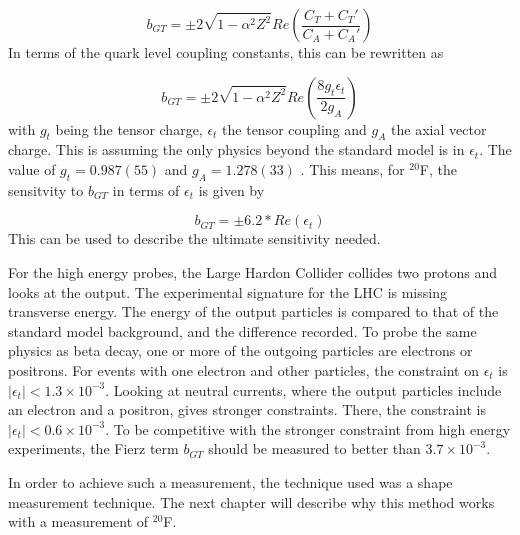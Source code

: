 \documentclass[../MaxHughesThesis.tex]{subfiles}
\begin{document}
\begin{equation}
	b_{GT} = \pm 2 \sqrt{1 - \alpha^{2} Z^{2}} Re(\frac{C_{T} + C_{T}'}{C_{A} + C_{A}'})
	\label{eq:bgt}
\end{equation}
In terms of the quark level coupling constants, this can be rewritten as \cite{Gon19} %

\begin{equation}
	b_{GT} = \pm 2 \sqrt{1 - \alpha^{2} Z^{2}} Re(\frac{8 g_{t} \epsilon_{t}}{2 g_{A}})
	\label{eq:bgtquarklevel}
\end{equation}
with $g_{t}$ being the tensor charge, $\epsilon_{t}$ the tensor coupling and $g_{A}$ the axial vector charge.
This is assuming the only physics beyond the standard model is in $\epsilon_{t}$.
The value of $g_{t} = 0.987(55)$ and $g_{A} = 1.278 (33)$ \cite{Gon19}.
This means, for $^{20}$F, the sensitvity to $b_{GT}$ in terms of $\epsilon_{t}$ is given by %

\begin{equation}
	b_{GT} = \pm 6.2 * Re(\epsilon_{t})
	\label{eq:bgtpropor}
\end{equation}
This can be used to describe the ultimate sensitivity needed.

For the high energy probes, the Large Hardon Collider collides two protons and looks at the output. 
The experimental signature for the LHC is missing transverse energy.
The energy of the output particles is compared to that of the standard model background, and the difference recorded.
To probe the same physics as beta decay, one or more of the outgoing particles are electrons or positrons.
For events with one electron and other particles, the constraint on $\epsilon_{t}$ is $|\epsilon_{t}| < 1.3 \times 10^{-3}$.
Looking at neutral currents, where the output particles include an electron and a positron, gives stronger constraints.
There, the constraint is $|\epsilon_{t}| < 0.6 \times 10^{-3}$.
To be competitive with the stronger constraint from high energy experiments, the Fierz term $b_{GT}$ should be measured to better than $3.7 \times 10^{-3}$. 

In order to achieve such a measurement, the technique used was a shape measurement technique.
The next chapter will describe why this method works with a measurement of $^{20}$F.
\end{document}
